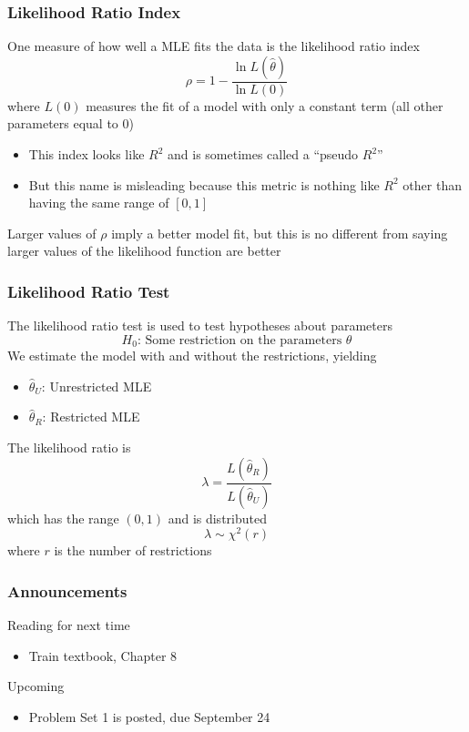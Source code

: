 \documentclass{beamer}
\begin{document}
\begin{frame}\frametitle{Likelihood Ratio Index}
    One measure of how well a MLE fits the data is the likelihood ratio index
    $$\rho = 1 - \frac{\ln L(\hat{\theta})}{\ln L(0)}$$
    where $L(0)$ measures the fit of a model with only a constant term (all other parameters equal to 0)
    \begin{itemize}
        \item This index looks like $R^2$ and is sometimes called a ``pseudo $R^2$''
        \item But this name is misleading because this metric is nothing like $R^2$ other than having the same range of $[0, 1]$
    \end{itemize}
    \vspace{2ex}
    Larger values of $\rho$ imply a better model fit, but this is no different from saying larger values of the likelihood function are better
\end{frame}

\begin{frame}\frametitle{Likelihood Ratio Test}
    The likelihood ratio test is used to test hypotheses about parameters
    $$H_0 \text{: Some restriction on the parameters } \theta$$
    We estimate the model with and without the restrictions, yielding
    \begin{itemize}
        \item $\hat{\theta}_U$: Unrestricted MLE
        \item $\hat{\theta}_R$: Restricted MLE
    \end{itemize}
    \vspace{2ex}
    The likelihood ratio is
    $$\lambda = \frac{L(\hat{\theta}_R)}{L(\hat{\theta}_U)}$$
    which has the range $(0, 1)$ and is distributed
    $$\lambda \sim \chi^2(r)$$
    where $r$ is the number of restrictions
\end{frame}

\begin{frame}\frametitle{Announcements}
    Reading for next time
    \begin{itemize}
        \item Train textbook, Chapter 8
    \end{itemize}
    \vspace{3ex}
    Upcoming
    \begin{itemize}
        \item Problem Set 1 is posted, due September 24
    \end{itemize}
\end{frame}
\end{document}
